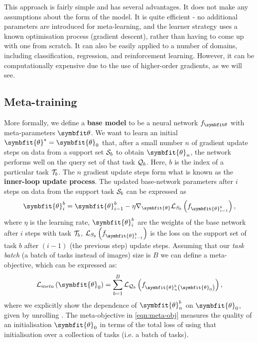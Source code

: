 This approach is fairly simple and has several advantages. It does not make any assumptions about the form of the model. It is quite efficient - no additional parameters are introduced for meta-learning, and the learner strategy uses a known optimisation process (gradient descent), rather than having to come up with one from scratch. It can also be easily applied to a number of domains, including classification, regression, and reinforcement learning. However, it can be computationally expensive due to the use of higher-order gradients, as we will see.

\subsection{Meta-training}\label{ssec:meta-training}
More formally, we define a \textbf{base model} to be a neural network $\ft$ with meta-parameters $\symbfit \theta$. We want to learn an initial $\symbfit{\theta}^\star = \symbfit{\theta}_0$ that, after a small number $n$ of gradient update steps on data from a support set $\mathcal{S}_b$ to obtain $\symbfit{\theta}_n$, the network performs well on the query set of that task $\mathcal{Q}_b$. Here, $b$ is the index of a particular task $\mathcal{T}_b$. The $n$ gradient update steps form what is known as the \textbf{inner-loop update process}. The updated base-network parameters after $i$ steps on data from the support task $\mathcal{S}_b$ can be expressed as
\begin{equation}
\label{eqn:inner-update}
\symbfit{\theta}_{i}^{b}=\symbfit{\theta}_{i-1}^{b}-\eta \nabla_{\symbfit{\theta}} \mathcal{L}_{S_{b}}\left(f_{\symbfit{\theta}_{i-1}^{b}}\right),
\end{equation}
where $\eta$ is the learning rate, $\symbfit{\theta}_i^b$ are the weights of the base network after $i$ steps with task $\mathcal{T}_b$, $\mathcal{L}_{S_{b}}\left(f_{\symbfit{\theta}_{i-1}^{b}}\right)$ is the loss on the support set of task $b$ after $(i-1)$ (the previous step) update steps. Assuming that our \textit{task batch} (a batch of tasks instead of images) size is $B$ we can define a meta-objective, which can be expressed as:
\begin{equation}
\label{eqn:meta-obj}
\mathcal{L}_{m e t a}\left(\symbfit{\theta}_{0}\right)=\sum_{b=1}^{B} \mathcal{L}_{\mcQ_{b}}\left(f_{\symbfit{\theta}_{n}^{b}\left(\symbfit{\theta}_{0}\right)}\right),
\end{equation}
where we explicitly show the dependence of $\symbfit{\theta}_n^b$ on $\symbfit{\theta}_0$, given by unrolling . The meta-objective in \cref{eqn:meta-obj} measures the quality of an initialisation $\symbfit{\theta}_0$ in terms of the total loss of using that initialisation over a collection of tasks (i.e. a batch of tasks).
